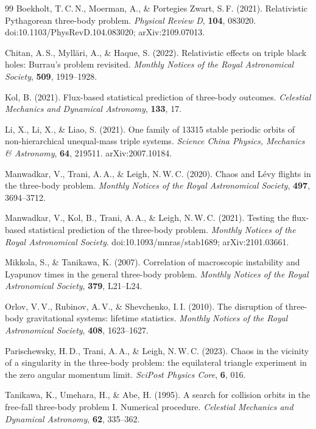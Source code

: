 \documentclass[11pt,a4paper]{article}
\begin{document}
\begin{thebibliography}{99}
Boekholt, T.\,C.\,N., Moerman, A., \& Portegies Zwart, S.\,F. (2021).
Relativistic Pythagorean three-body problem.
\textit{Physical Review D}, \textbf{104}, 083020.
doi:10.1103/PhysRevD.104.083020; arXiv:2109.07013.

Chitan, A.\,S., Myll\"{a}ri, A., \& Haque, S. (2022).
Relativistic effects on triple black holes: Burrau's problem revisited.
\textit{Monthly Notices of the Royal Astronomical Society}, \textbf{509}, 1919--1928.

Kol, B. (2021).
Flux-based statistical prediction of three-body outcomes.
\textit{Celestial Mechanics and Dynamical Astronomy}, \textbf{133}, 17.

Li, X., Li, X., \& Liao, S. (2021).
One family of 13315 stable periodic orbits of non-hierarchical unequal-mass triple systems.
\textit{Science China Physics, Mechanics \& Astronomy}, \textbf{64}, 219511.
arXiv:2007.10184.

Manwadkar, V., Trani, A.\,A., \& Leigh, N.\,W.\,C. (2020).
Chaos and L\'{e}vy flights in the three-body problem.
\textit{Monthly Notices of the Royal Astronomical Society}, \textbf{497}, 3694--3712.

Manwadkar, V., Kol, B., Trani, A.\,A., \& Leigh, N.\,W.\,C. (2021).
Testing the flux-based statistical prediction of the three-body problem.
\textit{Monthly Notices of the Royal Astronomical Society}.
doi:10.1093/mnras/stab1689; arXiv:2101.03661.

Mikkola, S., \& Tanikawa, K. (2007).
Correlation of macroscopic instability and Lyapunov times in the general three-body problem.
\textit{Monthly Notices of the Royal Astronomical Society}, \textbf{379}, L21--L24.

Orlov, V.\,V., Rubinov, A.\,V., \& Shevchenko, I.\,I. (2010).
The disruption of three-body gravitational systems: lifetime statistics.
\textit{Monthly Notices of the Royal Astronomical Society}, \textbf{408}, 1623--1627.

Parischewsky, H.\,D., Trani, A.\,A., \& Leigh, N.\,W.\,C. (2023).
Chaos in the vicinity of a singularity in the three-body problem: the equilateral triangle experiment in the zero angular momentum limit.
\textit{SciPost Physics Core}, \textbf{6}, 016.

Tanikawa, K., Umehara, H., \& Abe, H. (1995).
A search for collision orbits in the free-fall three-body problem I. Numerical procedure.
\textit{Celestial Mechanics and Dynamical Astronomy}, \textbf{62}, 335--362.


\end{thebibliography}
\end{document}
